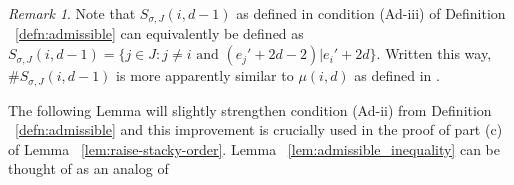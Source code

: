 \documentclass{amsart}
\theoremstyle{plain}
\newtheorem{lem}[thm]{Lemma}
\theoremstyle{definition}
\theoremstyle{remark}
\newtheorem{rem}[thm]{Remark}
\numberwithin{equation}{section}
\newcommand\BN{{\mathbb N}}
\newcommand \sx{\mathscr X}
\DeclareMathOperator{\ord}{ord}
\newcommand \halfcan{L}
\begin{document}
\begin{rem}
Note that $S_{\sigma,J}(i,d-1)$ as defined in condition (Ad-iii) of Definition ~\ref{defn:admissible} can equivalently be defined as $S_{\sigma,J}(i,d-1)= \{j \in J : j \neq i \text{ and }(e_j' + 2d-2)|e_i' + 2d\}.$ Written this way, $\# S_{\sigma,J}(i,d-1)$ is more apparently similar to $\mu(i,d)$ as defined in \cite[Defintion 8.5.1]{vzb:stacky}.
\end{rem}


%

The following Lemma will slightly strengthen condition (Ad-ii) from Definition ~\ref{defn:admissible} and this improvement is crucially used in the proof of part (c) of Lemma ~\ref{lem:raise-stacky-order}. Lemma ~\ref{lem:admissible_inequality} can be thought of as an analog of \cite[Lemma 8.5.3]{vzb:stacky}
\end{document}
